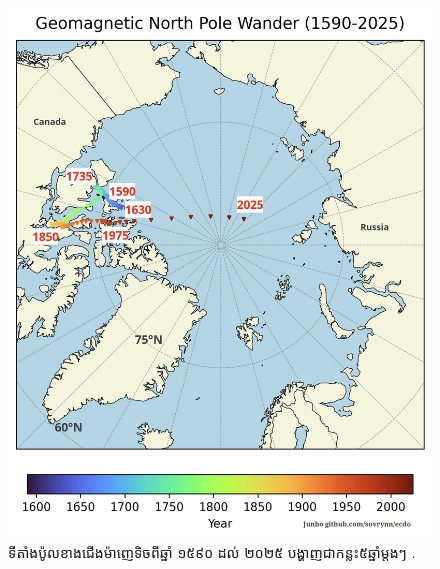 \documentclass[10pt,twocolumn,letterpaper]{article}
\begin{document}
\begin{figure}[t]
\begin{center}
   \includegraphics[width=1\linewidth]{npw.jpg}
\end{center}
\caption{ទីតាំងប៉ូលខាងជើងម៉ាញេទិចពីឆ្នាំ ១៥៩០ ដល់ ២០២៥ បង្ហាញជាកន្លះ៥ឆ្នាំម្តងៗ \cite{142}.}
\label{fig:13}
\label{fig:onecol}
\end{figure}
\end{document}
